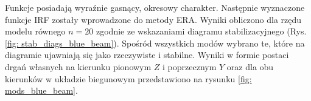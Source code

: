Funkcje posiadają wyraźnie gasnący, okresowy charakter. Następnie wyznaczone funkcje IRF zostały wprowadzone do metody ERA. Wyniki obliczono dla rzędu modelu równego $n=20$ zgodnie ze wskazaniami diagramu stabilizacyjnego (Rys. \ref{fig: stab_diags_blue_beam}). Spośród wszystkich modów wybrano te, które na diagramie ujawniają się jako rzeczywiste i stabilne. Wyniki w formie postaci drgań własnych na kierunku pionowym $Z$ i poprzecznym $Y$ oraz dla obu kierunków w układzie biegunowym przedstawiono na rysunku \ref{fig: mods_blue_beam}. 


















